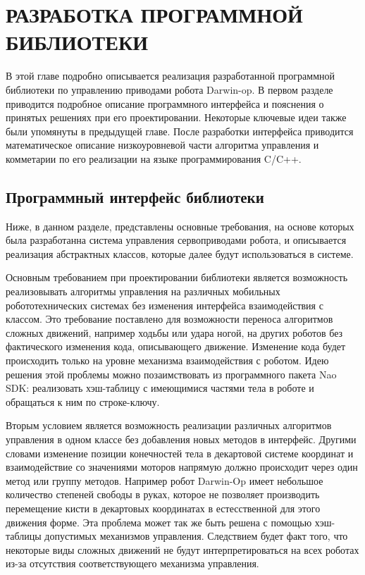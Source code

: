 \chapter{РАЗРАБОТКА ПРОГРАММНОЙ БИБЛИОТЕКИ}

В этой главе подробно описывается реализация разработанной программной библиотеки по управлению приводами робота Darwin-op. В первом разделе приводится подробное описание программного интерфейса и пояснения о принятых решениях при его проектировании. Некоторые ключевые идеи также были упомянуты в предыдущей главе. После разработки интерфейса приводится математическое описание низкоуровневой части алгоритма управления и комметарии по его реализации на языке программирования C/C++.

\section{Программный интерфейс библиотеки}

Ниже, в данном разделе, представлены основные требования, на основе которых была разработанна система управления сервоприводами робота, и описывается реализация абстрактных классов, которые далее будут использоваться в системе.

Основным требованием при проектировании библиотеки является возможность реализовывать алгоритмы управления на различных мобильных робототехнических системах без изменения интерфейса взаимодействия с классом. Это требование поставлено для возможности переноса  алгоритмов сложных движений, например ходьбы или удара ногой, на других роботов без фактического изменения кода, описывающего движение. Изменение кода будет происходить только на уровне механизма взаимодействия с роботом. Идею решения этой проблемы можно позаимствовать из программного пакета Nao SDK: реализовать хэш-таблицу с имеющимися частями тела в роботе и обращаться к ним по строке-ключу.

Вторым условием является возможность реализации различных алгоритмов управления в одном классе без добавления новых методов в интерфейс. Другими словами изменение позиции конечностей тела в декартовой системе координат и взаимодействие со значениями моторов напрямую должно происходит через один метод или группу методов. Например робот Darwin-Op имеет небольшое количество степеней свободы в руках, которое не позволяет производить перемещение кисти в декартовых координатах в естесственной для этого движения форме. Эта проблема может так же быть решена с помощью хэш-таблицы допустимых механизмов управления. Следствием будет факт того, что некоторые виды сложных движений не будут интерпретироваться на всех роботах из-за отсутствия соответствующего механизма управления.

